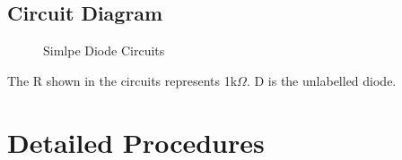 \newpage
    \subsection{Circuit Diagram}
    \begin{figure}[h]

        \begin{subfigure}[h]{0.47\textwidth}
        \begin{center}
            
            \caption{}
            \label{Lab1a}
        \end{center} 
        \end{subfigure}
    \hfill
    \vspace{0.2 cm}
        \begin{subfigure}[h]{0.47\textwidth}
        \begin{center}
            
            \caption{}
            \label{Lab1b}
        \end{center}
        \end{subfigure}
    \vfill
    \vspace{0.2 cm}
        \begin{subfigure}[h]{0.47\textwidth}
        \begin{center}
             
            \caption{}
            \label{Lab1c}
        \end{center}
        \end{subfigure}
    \hfill
        \begin{subfigure}[h]{0.47\textwidth}
        \begin{center}
            
            \caption{}
            \label{Lab1d}
        \end{center}
        \end{subfigure}
    \caption{Simlpe Diode Circuits}
    \label{SDC}

    \end{figure}
\FloatBarrier
The R shown in the circuits represents 1k$\Omega$. D is the unlabelled diode.


\section{Detailed Procedures}
